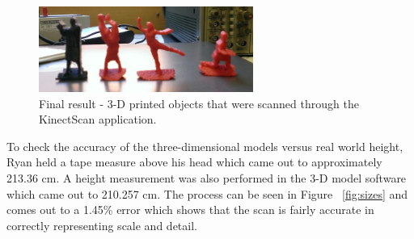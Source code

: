 \documentclass[pdftex,10.5pt]{report}
\begin{document}
\begin{figure}[H]
	\centering
	\includegraphics[width=70mm]{figures/actionfigures.jpg}
	\caption{Final result - 3-D printed objects that were scanned through the KinectScan application.}
	\label{fig:actionfigures}
\end{figure}

To check the accuracy of the three-dimensional models versus real world height, Ryan held a tape measure above his head which came out to approximately 213.36 cm. A height measurement was also performed in the 3-D model software which came out to 210.257 cm. The process can be seen in Figure ~\ref{fig:sizes} and comes out to a 1.45\% error which shows that the scan is fairly accurate in correctly representing scale and detail.
\end{document}
